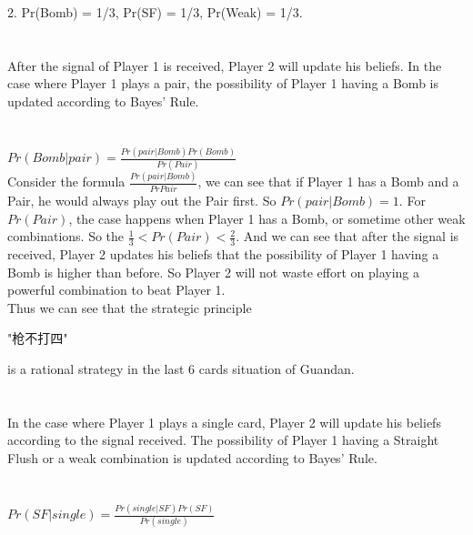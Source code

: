 \documentclass{article}
\begin{document}
2. Pr(Bomb) = 1/3, Pr(SF) = 1/3, Pr(Weak) = 1/3.\\
\\ \hspace*{\fill} \\
After the signal of Player 1 is received, Player 2 will update his beliefs. In the case where Player 1 plays a pair, the possibility of Player 1 having a Bomb is updated according to Bayes' Rule.\\
\\ \hspace*{\fill} \\
$
    Pr(Bomb|pair) = \frac{Pr(pair|Bomb)Pr(Bomb)}{Pr(Pair)}
$\\

Consider the formula $\frac{Pr(pair|Bomb)}{Pr{Pair}}$, we can see that if Player 1 has a Bomb and a Pair, he would always play out the Pair first. So $Pr(pair|Bomb) = 1$. For $Pr(Pair)$, the case happens when Player 1 has a Bomb, or sometime other weak combinations. So the $\frac{1}{3} < Pr(Pair) < \frac{2}{3}$. 
And we can see that after the signal is received, Player 2 updates his beliefs that the possibility of Player 1 having a Bomb is higher than before. 
So Player 2 will not waste effort on playing a powerful combination to beat Player 1.\\
Thus we can see that the strategic principle
\begin{CJK*}{UTF8}{gbsn}"枪不打四"  \end{CJK*}
is a rational strategy in the last 6 cards situation of Guandan.\\
\\ \hspace*{\fill} \\
In the case where Player 1 plays a single card, Player 2 will update his beliefs according to the signal received. The possibility of Player 1 having a Straight Flush or a weak combination is updated according to Bayes' Rule.\\
\\ \hspace*{\fill} \\
$
    Pr(SF|single) = \frac{Pr(single|SF)Pr(SF)}{Pr(single)}
$\\
\end{document}
